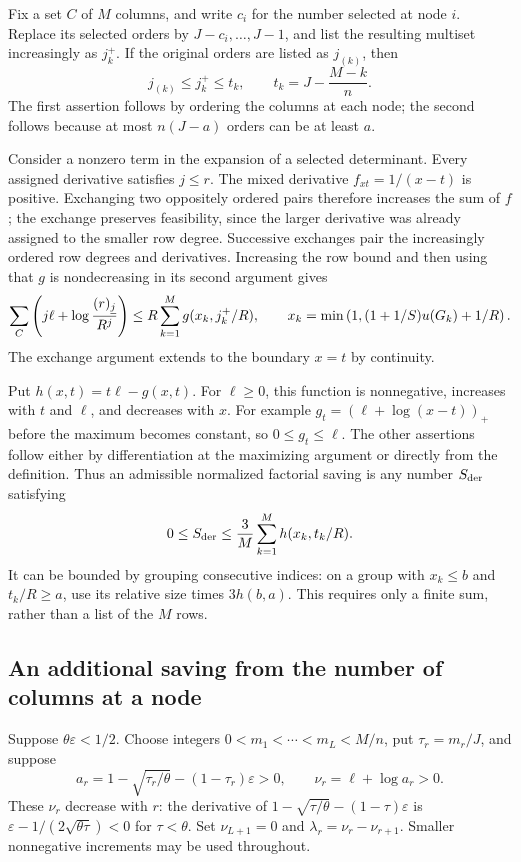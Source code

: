 Fix a set $C$ of $M$ columns, and write $c_i$ for the number selected at
node $i$. Replace its selected orders by $J-c_i,\ldots,J-1$, and list
the resulting multiset increasingly as $j_k^+$. If the original orders
are listed as $j_{(k)}$, then
\begin{equation}\label{eq:radial-order-envelope}
 j_{(k)}\leq j_k^+\leq t_k,
 \qquad t_k=J-\frac{M-k}{n}.
\end{equation}
The first assertion follows by ordering the columns at each node; the
second follows because at most $n(J-a)$ orders can be at least $a$.

Consider a nonzero term in the expansion of a selected determinant.
Every assigned derivative satisfies $j\leq r$. The mixed derivative
$f_{xt}=1/(x-t)$ is positive. Exchanging two oppositely ordered pairs
therefore increases the sum of $f$; the exchange preserves feasibility,
since the larger derivative was already assigned to the smaller row degree.
Successive exchanges pair the increasingly ordered row degrees and
derivatives. Increasing the row bound and then using that $g$ is
nondecreasing in its second argument gives
\begin{equation}\label{eq:radial-rearrangement}
 \sum_C\left(j\ell+
       \log\frac{(r)_{\underline{j}}}{R^j}\right)
 \leq R\sum_{k=1}^M g(x_k,j_k^+/R),
 \qquad x_k=\min\left(1,(1+1/S)u(G_k)+1/R\right).
\end{equation}
The exchange argument extends to the boundary $x=t$ by continuity.

Put $h(x,t)=t\ell-g(x,t)$. For $\ell\geq0$, this function is
nonnegative, increases with $t$ and $\ell$, and decreases with $x$.
For example $g_t=(\ell+\log(x-t))_+$ before the maximum becomes
constant, so $0\leq g_t\leq\ell$. The other assertions follow either
by differentiation at the maximizing argument or directly from the
definition. Thus an admissible normalized factorial saving is any
number $S_{\rm der}$ satisfying
\begin{equation}\label{eq:radial-derivative-saving}
 0\leq S_{\rm der}\leq\frac3M\sum_{k=1}^M h(x_k,t_k/R).
\end{equation}
It can be bounded by grouping consecutive indices: on a group with
$x_k\leq b$ and $t_k/R\geq a$, use its relative size times $3h(b,a)$.
This requires only a finite sum, rather than a list of the $M$ rows.

\subsection{An additional saving from the number of columns at a node}
Suppose $\theta\varepsilon<1/2$. Choose integers
$0<m_1<\cdots<m_L<M/n$, put $\tau_r=m_r/J$, and suppose
\[
 a_r=1-\sqrt{\tau_r/\theta}-(1-\tau_r)\varepsilon>0,
 \qquad \nu_r=\ell+\log a_r>0.
\]
These $\nu_r$ decrease with $r$: the derivative of
$1-\sqrt{\tau/\theta}-(1-\tau)\varepsilon$ is
$\varepsilon-1/(2\sqrt{\theta\tau})<0$ for $\tau<\theta$.
Set $\nu_{L+1}=0$ and $\lambda_r=\nu_r-\nu_{r+1}$.
Smaller nonnegative increments may be used throughout.

